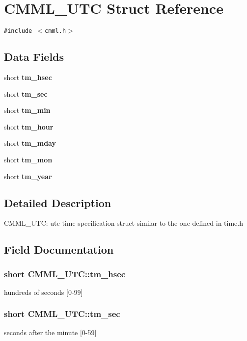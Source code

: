 \section{CMML\_\-UTC Struct Reference}
\label{structCMML__UTC}
{\tt \#include $<$cmml.h$>$}

\subsection*{Data Fields}
\begin{CompactItemize}
\item 
short {\bf tm\_\-hsec}
\item 
short {\bf tm\_\-sec}
\item 
short {\bf tm\_\-min}
\item 
short {\bf tm\_\-hour}
\item 
short {\bf tm\_\-mday}
\item 
short {\bf tm\_\-mon}
\item 
short {\bf tm\_\-year}
\end{CompactItemize}


\subsection{Detailed Description}
CMML\_\-UTC: utc time specification struct similar to the one defined in time.h 



\subsection{Field Documentation}
\subsubsection{\setlength{\rightskip}{0pt plus 5cm}short {\bf CMML\_\-UTC::tm\_\-hsec}}\label{structCMML__UTC_o0}


hundreds of seconds [0-99] 
\subsubsection{\setlength{\rightskip}{0pt plus 5cm}short {\bf CMML\_\-UTC::tm\_\-sec}}\label{structCMML__UTC_o1}


seconds after the minute [0-59] 
